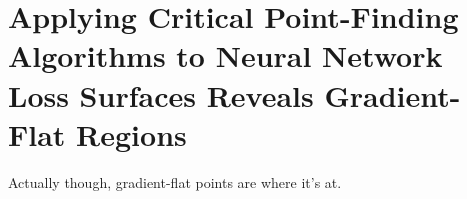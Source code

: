 \documentclass[../../thesis.tex]{subfiles}
\begin{document}
\chapter{Applying Critical Point-Finding Algorithms to Neural Network Loss Surfaces
Reveals Gradient-Flat Regions}

Actually though, gradient-flat points are where it's at.

\onlyinsubfile{\printbibliography}
\end{document}
